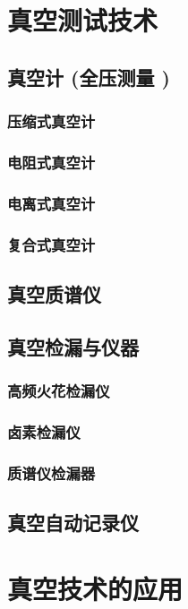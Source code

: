 \documentclass[UTF8]{../../ApplicationUniverse}
\begin{document}
\section{真空测试技术}
    \subsection{真空计 (全压测量 )}
        \subsubsection{压缩式真空计}
        \subsubsection{电阻式真空计}
        \subsubsection{电离式真空计}
        \subsubsection{复合式真空计}
    \subsection{真空质谱仪}
    \subsection{真空检漏与仪器}
        \subsubsection{高频火花检漏仪}
        \subsubsection{卤素检漏仪}
        \subsubsection{质谱仪检漏器}
    \subsection{真空自动记录仪}
\section{真空技术的应用}
\end{document}
